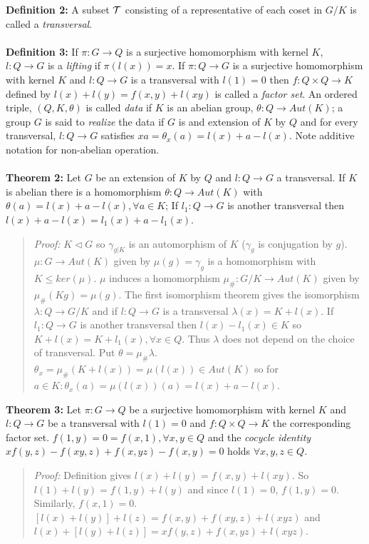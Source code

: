 {\bf Definition 2:}
A subset ${\cal T}$ consisting of a representative of each coset
in $G/K$ is called a \emph{transversal}.
\\
\\
{\bf Definition 3:}
If $\pi: G \rightarrow Q$ is a surjective homomorphism with kernel
$K$, $l: Q \rightarrow G$ is a \emph{lifting} if $\pi(l(x))=x$.
If $\pi: Q \rightarrow G$ is a surjective homomorphism with
kernel $K$ and $l:Q \rightarrow G$ is a transversal with $l(1)=0$ then
$f: Q \times Q \rightarrow K$ defined by $l(x)+l(y)= f(x,y) + l(xy)$ is
called a \emph{factor set}.  An ordered triple, $(Q, K, \theta)$ is called \emph{data}
if $K$ is an abelian group, $\theta: Q \rightarrow Aut(K)$; a group $G$ is said to
\emph{realize} the data if $G$ is and extension of $K$ by $Q$ and for every transversal,
$l: Q \rightarrow G$ satisfies $xa = \theta_x(a)
= l(x) +a-l(x)$.  Note additive notation for non-abelian operation.
\\
\\
{\bf Theorem 2:}
Let $G$ be an extension of $K$ by $Q$ and
$l: Q \rightarrow G$ a transversal.  If $K$ is abelian there is a homomorphism
$\theta: Q \rightarrow Aut(K)$ with $\theta(a)= l(x)+a-l(x), \forall a \in K$;
If $l_1: Q \rightarrow G$ is another transversal then
$ l(x)+a-l(x)= l_1(x)+a-l_1(x)$.
\begin{quote}
\emph{Proof:}
$K \lhd G$ so $\gamma_{g|K}$ is an automorphism of $K$ ($\gamma_g$ is conjugation by $g$).
$\mu: G \rightarrow Aut(K)$ given by $\mu(g)= \gamma_g$ is a homomorphism with
$K \leq ker(\mu)$.  $\mu$ induces a homomorphism $\mu_{\#}: G/K \rightarrow Aut(K)$ given by
$\mu_{\#}(Kg)= \mu(g)$.
The first isomorphism theorem gives the isomorphism $\lambda: Q \rightarrow G/K$ and if
$l:Q \rightarrow G$ is a transversal $\lambda(x)=K+l(x)$.
If $l_1: Q \rightarrow G$ is another transversal then $l(x) - l_1(x) \in K$ so
$ K+l(x)= K+l_1(x), \forall x \in Q $.  Thus $\lambda$ does not depend on the choice of transversal.
Put $\theta= \mu_{\#} \lambda$.  $\theta_x = \mu_{\#}(K+l(x))= \mu(l(x)) \in Aut(K)$ so for $a \in K:
\theta_x(a)= \mu(l(x))(a)= l(x)+a-l(x)$.
\end{quote}
{\bf Theorem 3:}
Let $\pi: G \rightarrow Q$ be a surjective homomorphism with kernel $K$ and
$l:Q \rightarrow G$ be a transversal with $l(1)=0$ and $f: Q \times Q \rightarrow K$ the corresponding
factor set.  $f(1,y)=0=f(x,1), \forall x,y \in Q$ and
the \emph{cocycle identity} $xf(y,z)-f(xy,z)+f(x,yz)-f(x,y)=0$ holds $\forall x,y,z \in Q$.
\begin{quote}
\emph{Proof:}  
Definition gives $l(x)+l(y)= f(x,y)+l(xy)$.
So $l(1)+l(y)= f(1,y)+l(y)$ and since $l(1)=0$, $f(1,y)= 0$.  Similarly, $f(x,1)=0$.
$[l(x)+l(y)]+l(z)= f(x,y)+f(xy,z)+l(xyz)$ and
$l(x)+[l(y)+l(z)]= xf(y,z)+f(x,yz)+l(xyz)$.
\end{quote}
